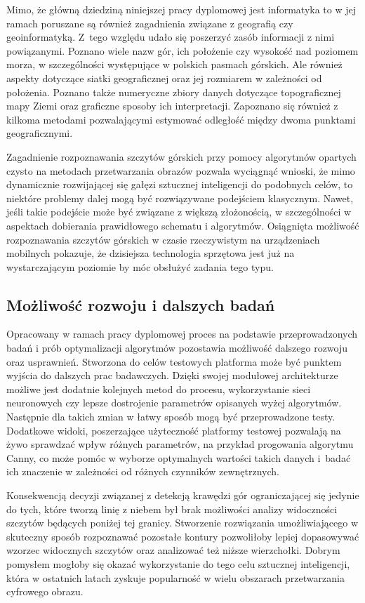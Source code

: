 Mimo, że główną dziedziną niniejszej pracy dyplomowej jest informatyka to w jej ramach poruszane są również zagadnienia związane z geografią czy geoinformatyką. Z~tego względu udało się poszerzyć zasób informacji z nimi powiązanymi. Poznano wiele nazw gór, ich położenie czy wysokość nad poziomem morza, w szczególności występujące w polskich pasmach górskich. Ale również aspekty dotyczące siatki geograficznej oraz jej rozmiarem w zależności od położenia. Poznano także numeryczne zbiory danych dotyczące topograficznej mapy Ziemi oraz graficzne sposoby ich interpretacji. Zapoznano się również z kilkoma metodami pozwalającymi estymować odległość między dwoma punktami geograficznymi.

Zagadnienie rozpoznawania szczytów górskich przy pomocy algorytmów opartych czysto na metodach przetwarzania obrazów pozwala wyciągnąć wnioski, że mimo dynamicznie rozwijającej się gałęzi sztucznej inteligencji do podobnych celów, to niektóre problemy dalej mogą być rozwiązywane podejściem klasycznym. Nawet, jeśli takie podejście może być związane z większą złożonością, w szczególności w aspektach dobierania prawidłowego schematu i algorytmów. Osiągnięta możliwość rozpoznawania szczytów górskich w czasie rzeczywistym na urządzeniach mobilnych pokazuje, że dzisiejsza technologia sprzętowa jest już na wystarczającym poziomie by móc obsłużyć zadania tego typu.



\subsection{Możliwość rozwoju i dalszych badań}

Opracowany w ramach pracy dyplomowej proces na podstawie przeprowadzonych badań i prób optymalizacji algorytmów pozostawia możliwość dalszego rozwoju oraz usprawnień. Stworzona do celów testowych platforma może być punktem wyjścia do dalszych prac badawczych. Dzięki swojej modułowej architekturze możliwe jest dodatnie kolejnych metod do procesu, wykorzystanie sieci neuronowych czy lepsze dostrojenie parametrów opisanych wyżej algorytmów. Następnie dla takich zmian w łatwy sposób mogą być przeprowadzone testy. Dodatkowe widoki, poszerzające użyteczność platformy testowej pozwalają na żywo sprawdzać wpływ różnych parametrów, na przykład progowania algorytmu Canny, co może pomóc w wyborze optymalnych wartości takich danych i~badać ich znaczenie w zależności od różnych czynników zewnętrznych.


Konsekwencją decyzji związanej z detekcją krawędzi gór ograniczającej się jedynie do tych, które tworzą linię z niebem był brak możliwości analizy widoczności szczytów będących poniżej tej granicy. Stworzenie rozwiązania umożliwiającego w skuteczny sposób rozpoznawać pozostałe kontury pozwoliłoby lepiej dopasowywać wzorzec widocznych szczytów oraz analizować też niższe wierzchołki. Dobrym pomysłem mogłoby się okazać wykorzystanie do tego celu sztucznej inteligencji, która w ostatnich latach zyskuje popularność w wielu obszarach przetwarzania cyfrowego obrazu.


